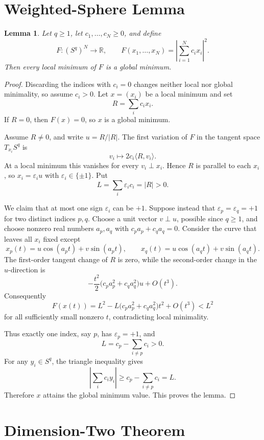 \documentclass[11pt]{article}
\newtheorem{lemma}{Lemma}
\newcommand{\R}{\mathbb R}
\begin{document}
\section*{Weighted-Sphere Lemma}

\begin{lemma}\label{lem:weighted-sphere}
Let \(q\ge 1\), let \(c_1,\ldots,c_N\ge 0\), and define
\[
        F:(S^q)^N\to\R,\qquad
        F(x_1,\ldots,x_N)=\left|\sum_{i=1}^N c_i x_i\right|^2 .
\]
Then every local minimum of \(F\) is a global minimum.
\end{lemma}

\begin{proof}
Discarding the indices with \(c_i=0\) changes neither local nor global minimality, so assume \(c_i>0\). Let \(x=(x_i)\) be a local minimum and set
\[
        R=\sum_i c_i x_i.
\]
If \(R=0\), then \(F(x)=0\), so \(x\) is a global minimum.

Assume \(R\ne 0\), and write \(u=R/|R|\). The first variation of \(F\) in the tangent space \(T_{x_i}S^q\) is
\[
        v_i\mapsto 2c_i\langle R,v_i\rangle .
\]
At a local minimum this vanishes for every \(v_i\perp x_i\). Hence \(R\) is parallel to each \(x_i\), so \(x_i=\varepsilon_i u\) with \(\varepsilon_i\in\{\pm1\}\). Put
\[
        L=\sum_i \varepsilon_i c_i=|R|>0.
\]

We claim that at most one sign \(\varepsilon_i\) can be \(+1\). Suppose instead that \(\varepsilon_p=\varepsilon_q=+1\) for two distinct indices \(p,q\). Choose a unit vector \(v\perp u\), possible since \(q\ge 1\), and choose nonzero real numbers \(a_p,a_q\) with \(c_p a_p+c_q a_q=0\). Consider the curve that leaves all \(x_i\) fixed except
\[
        x_p(t)=u\cos(a_p t)+v\sin(a_p t),\qquad
        x_q(t)=u\cos(a_q t)+v\sin(a_q t).
\]
The first-order tangent change of \(R\) is zero, while the second-order change in the \(u\)-direction is
\[
        -\frac{t^2}{2}\bigl(c_p a_p^2+c_q a_q^2\bigr)u+O(t^3).
\]
Consequently
\[
        F(x(t))=L^2-L\bigl(c_p a_p^2+c_q a_q^2\bigr)t^2+O(t^3)<L^2
\]
for all sufficiently small nonzero \(t\), contradicting local minimality.

Thus exactly one index, say \(p\), has \(\varepsilon_p=+1\), and
\[
        L=c_p-\sum_{i\ne p}c_i>0.
\]
For any \(y_i\in S^q\), the triangle inequality gives
\[
        \left|\sum_i c_i y_i\right|
        \ge c_p-\sum_{i\ne p}c_i=L.
\]
Therefore \(x\) attains the global minimum value. This proves the lemma.
\end{proof}

\section*{Dimension-Two Theorem}
\end{document}
